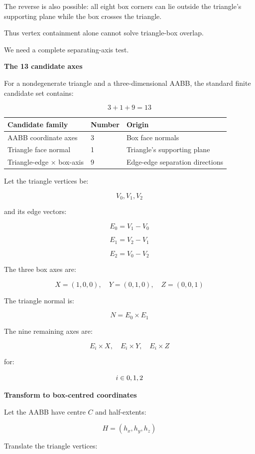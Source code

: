 The reverse is also possible: all eight box corners can lie outside the triangle's supporting plane while the box crosses the triangle.

Thus vertex containment alone cannot solve triangle-box overlap.

We need a complete separating-axis test.

\textbf{The 13 candidate axes}

For a nondegenerate triangle and a three-dimensional AABB, the standard finite candidate set contains:

\[
\boxed{ 3+1+9=13 }
\]

{\def\LTcaptype{none} %
\begin{longtable}[]{@{}lll@{}}
\toprule\noalign{}
Candidate family & Number & Origin \\
\midrule\noalign{}
\endhead
\bottomrule\noalign{}
\endlastfoot
AABB coordinate axes & 3 & Box face normals \\
Triangle face normal & 1 & Triangle's supporting plane \\
Triangle-edge × box-axis & 9 & Edge-edge separation directions \\
\end{longtable}
}

Let the triangle vertices be:

\[
V_0,V_1,V_2
\]

and its edge vectors:

\[
E_0=V_1-V_0
\]

\[
E_1=V_2-V_1
\]

\[
E_2=V_0-V_2
\]

The three box axes are:

\[
X=(1,0,0),\quad Y=(0,1,0),\quad Z=(0,0,1)
\]

The triangle normal is:

\[
\boxed{ N=E_0\times E_1 }
\]

The nine remaining axes are:

\[
E_i\times X,\quad E_i\times Y,\quad E_i\times Z
\]

for:

\[
i\in\\{0,1,2\\}
\]

\textbf{Transform to box-centred coordinates}

Let the AABB have centre \(C\) and half-extents:

\[
H=(h_x,h_y,h_z)
\]

Translate the triangle vertices:

